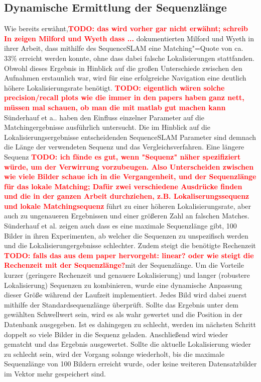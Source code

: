 \documentclass[12pt,a4paper,titlepage]{scrartcl}
\newcommand{\todo}[1]{\textcolor{red}{\textbf{TODO: #1}}}
\begin{document}
\subsection{Dynamische Ermittlung der Sequenzlänge}
Wie bereits erwähnt,\todo{das wird vorher gar nicht erwähnt; schreib  In \cite{bla} zeigen Milford und Wyeth dass ...} dokumentierten Milford und Wyeth in ihrer Arbeit, dass mithilfe des SequenceSLAM eine Matching"=Quote von ca. $33\%$ erreicht werden konnte, ohne dass dabei falsche Lokalisierungen stattfanden. Obwohl dieses Ergebnis in Hinblick auf die großen Unterschiede zwischen den Aufnahmen erstaunlich war, wird für eine erfolgreiche Navigation eine deutlich höhere Lokalisierungsrate benötigt.
\todo{eigentlich wären solche precision/recall plots wie die immer in den papers haben ganz nett, müssen mal schauen, ob man die mit matlab gut machen kann}
Sünderhauf et a.. \cite{sunderhauf2013we} haben den Einfluss einzelner Parameter auf die Matchingergebnisse ausführlich untersucht. Die im Hinblick auf die Lokalisierungsergebnisse entscheidenden SequenceSLAM Parameter sind demnach die Länge der verwendeten Sequenz und das Vergleichsverfahren.
Eine längere Sequenz \todo{ich fände es gut, wenn "Sequenz" näher spezifiziert würde, um der Verwirrung vorzubeugen. Also Unterscheiden zwischen wie viele Bilder schaue ich in die Vergangenheit, und der Sequenzlänge für das lokale Matching; Dafür zwei verschiedene Ausdrücke finden und die in der ganzen Arbeit durchziehen, z.B. Lokaliserungssequenz und lokale Matchingsequenz} führt zu einer höheren Lokalisierungsrate, aber auch zu ungenaueren Ergebnissen und einer größeren Zahl an falschen Matches. Sünderhauf et al. zeigen auch dass es eine maximale Sequenzlänge gibt, 100 Bilder in ihren Experimenten, ab welcher die Sequenzen zu unspezifisch werden und die Lokalisierungergebnisse schlechter. Zudem steigt die benötigte Rechenzeit \todo{falls das aus dem paper hervorgeht: linear? oder wie steigt die Rechenzeit mit der Sequenzlänge?}mit der Sequenzlänge.
Um die Vorteile kurzer (geringere Rechenzeit und genauere Lokalisierung) und langer (robustere Lokalisierung) Sequenzen  zu kombinieren, wurde eine dynamische Anpassung dieser Größe während der Laufzeit implementiert. Jedes Bild wird dabei zuerst mithilfe der Standardsequenzlänge überprüft. Sollte das Ergebnis unter dem gewählten Schwellwert sein, wird es als wahr gewertet und die Position in der Datenbank ausgegeben. Ist es dahingegen zu schlecht, werden im nächsten Schritt doppelt so viele Bilder in die Sequenz geladen. Anschließend wird wieder gematcht und das Ergebnis ausgewertet. Sollte die aktuelle Lokalisierung wieder zu schlecht sein, wird der Vorgang solange wiederholt, bis die maximale Sequenzlänge von 100 Bildern erreicht wurde, oder keine weiteren Datensatzbilder im Vektor mehr gespeichert sind.
\end{document}
